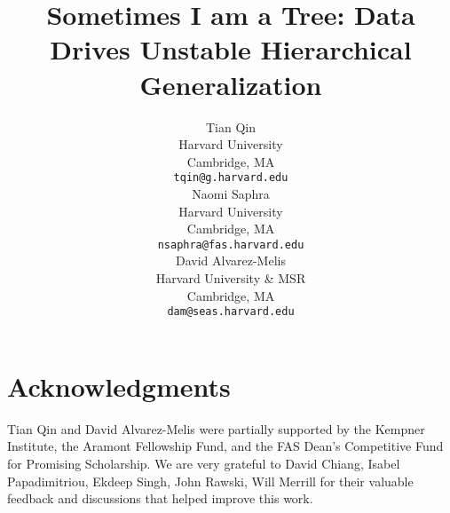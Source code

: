 \documentclass{article}
\title{Sometimes I am a Tree:
Data Drives Unstable Hierarchical Generalization}
\author{
  Tian Qin \\
  Harvard University \\
  Cambridge, MA\\
   \texttt{tqin@g.harvard.edu} \\
   \And
  Naomi Saphra \\
  Harvard University \\
  Cambridge, MA\\
\texttt{nsaphra@fas.harvard.edu} \\
  \And
  David Alvarez-Melis \\
  Harvard University \& MSR \\
  Cambridge, MA\\
   \texttt{dam@seas.harvard.edu}  \\
}
\begin{document}
\maketitle
% 








% 
\section*{Acknowledgments}
Tian Qin and David Alvarez-Melis were partially supported by the Kempner Institute, the Aramont Fellowship Fund, and the FAS Dean’s Competitive Fund for Promising Scholarship. We are very grateful to David Chiang, Isabel Papadimitriou, Ekdeep Singh, John Rawski, Will Merrill for their valuable feedback and discussions that helped improve this work. 
\clearpage
% 
% 
\newrefcontext[sorting=nyt]
\printbibliography[title=References]
% 
% 

\clearpage
\appendix


\end{document}
